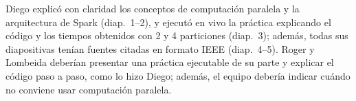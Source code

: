 
\retroalimentacion
    {Diego explicó con claridad los conceptos de computación paralela y la arquitectura de Spark (diap.~1--2), y ejecutó en vivo la práctica explicando el código y los tiempos obtenidos con 2 y 4 particiones (diap.~3); además, todas sus diapositivas tenían fuentes citadas en formato IEEE (diap.~4--5).}
    {Roger y Lombeida deberían presentar una práctica ejecutable de su parte y explicar el código paso a paso, como lo hizo Diego; además, el equipo debería indicar cuándo no conviene usar computación paralela.}

\clearpage

